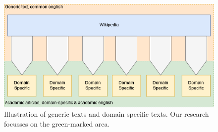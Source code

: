 \documentclass[../../Thesis.tex]{subfiles}
\begin{document}
\begin{figure}[hbt]
\includegraphics[width=6.5in]{Plots/domain_specification_graph}
\caption{Illustration of generic texts and domain specific texts. Our research focusses on the green-marked area.}\label{figure:domainPlot}
\end{figure}
\end{document}
